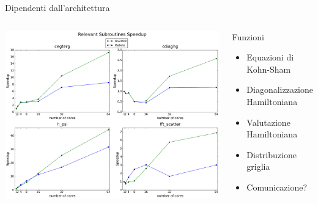 \documentclass[8pt]{beamer}
\begin{document}
\begin{frame}{Dipendenti dall'architettura}
\begin{columns}
		\begin{center}			
			\vspace{-1cm}
			\includegraphics[width=1.1\textwidth]{beam_arch_subroutines.pdf}			
		\end{center}
		\begin{overlayarea}{\linewidth}{\textheight}
		\begin{block}{Funzioni}
			\begin{itemize}
				\item<1-> Equazioni di Kohn-Sham
				\item<2-> Diagonalizzazione Hamiltoniana
				\item<3-> Valutazione Hamiltoniana
				\item<4-> Distribuzione griglia
				\item<5-> Comunicazione?
			\end{itemize}		
		\end{block}

		\end{overlayarea}
\end{columns}

\end{frame}
\end{document}
